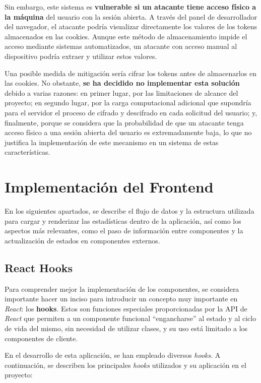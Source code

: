 Sin embargo, este sistema es \textbf{vulnerable si un atacante tiene acceso físico a la máquina} del usuario con la sesión abierta. A través del panel de desarrollador del navegador, el atacante podría visualizar directamente los valores de los tokens almacenados en las cookies. Aunque este método de almacenamiento impide el acceso mediante sistemas automatizados, un atacante con acceso manual al dispositivo podría extraer y utilizar estos valores.

Una posible medida de mitigación sería cifrar los tokens antes de almacenarlos en las cookies. No obstante, \textbf{se ha decidido no implementar esta solución} debido a varias razones: en primer lugar, por las limitaciones de alcance del proyecto; en segundo lugar, por la carga computacional adicional que supondría para el servidor el proceso de cifrado y descifrado en cada solicitud del usuario; y, finalmente, porque se considera que la probabilidad de que un atacante tenga acceso físico a una sesión abierta del usuario es extremadamente baja, lo que no justifica la implementación de este mecanismo en un sistema de estas características.

\section{Implementación del Frontend}

En los siguientes apartados, se describe el flujo de datos y la estructura utilizada para cargar y renderizar las estadísticas dentro de la aplicación, así como los aspectos más relevantes, como el paso de información entre componentes y la actualización de estados en componentes externos.

\subsection{React Hooks}

Para comprender mejor la implementación de los componentes, se considera importante hacer un inciso para introducir un concepto muy importante en \textit{React}: los \textbf{hooks}. Estos son funciones especiales proporcionadas por la API de \textit{React} que permiten a un componente funcional ``engancharse'' al estado y al ciclo de vida del mismo, sin necesidad de utilizar clases, y su uso está limitado a los componentes de cliente.

En el desarrollo de esta aplicación, se han empleado diversos \textit{hooks}. A continuación, se describen los principales \textit{hooks} utilizados y su aplicación en el proyecto:

